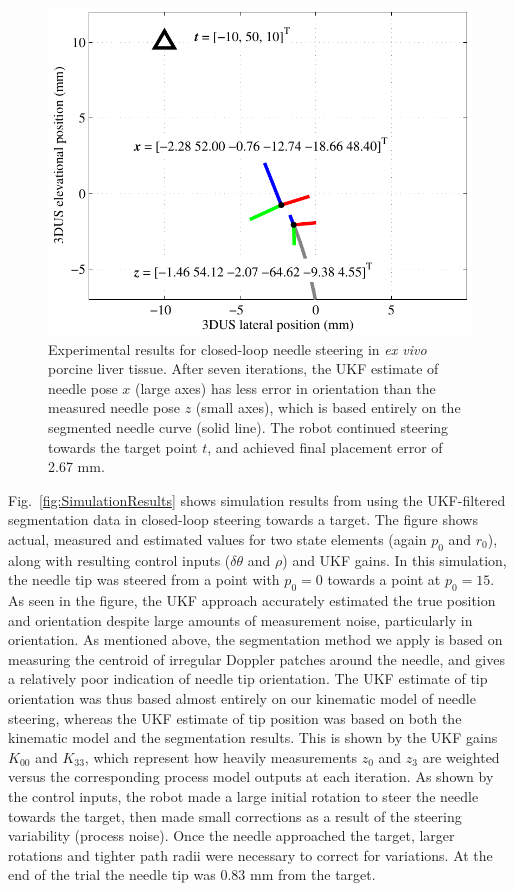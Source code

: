 \begin{figure}[!t]
\centering
\includegraphics[width=0.7\columnwidth]{Images/Chapter4/ExperimentalResults/ExperimentalResults}%
\caption[Results using UKF in autonomous control]{Experimental results for closed-loop needle steering in \textit{ex vivo} porcine liver tissue. After seven iterations, the UKF estimate of needle pose ${x}$ (large axes) has less error in orientation than the measured needle pose ${z}$ (small axes), which is based entirely on the segmented needle curve (solid line). The robot continued steering towards the target point ${t}$, and achieved final placement error of 2.67 mm.}
\label{fig:ExperimentalResults}
\end{figure}

Fig.~\ref{fig:SimulationResults} shows simulation results from using the UKF-filtered segmentation data in closed-loop steering towards a target. The figure shows actual, measured and estimated values for two state elements (again $p_0$ and $r_0$), along with resulting control inputs ($\delta\theta$ and $\rho$) and UKF gains. In this simulation, the needle tip was steered from a point with $p_0 = 0$ towards a point at $p_0 = 15$. As seen in the figure, the UKF approach accurately estimated the true position and orientation despite large amounts of measurement noise, particularly in orientation. As mentioned above, the segmentation method we apply is based on measuring the centroid of irregular Doppler patches around the needle, and gives a relatively poor indication of needle tip orientation. The UKF estimate of tip orientation was thus based almost entirely on our kinematic model of needle steering, whereas the UKF estimate of tip position was based on both the kinematic model and the segmentation results. This is shown by the UKF gains $K_{00}$ and $K_{33}$, which represent how heavily measurements $z_0$ and $z_3$ are weighted versus the corresponding process model outputs at each iteration. As shown by the control inputs, the robot made a large initial rotation to steer the needle towards the target, then made small corrections as a result of the steering variability (process noise). Once the needle approached the target, larger rotations and tighter path radii were necessary to correct for variations. At the end of the trial the needle tip was 0.83 mm from the target.    

